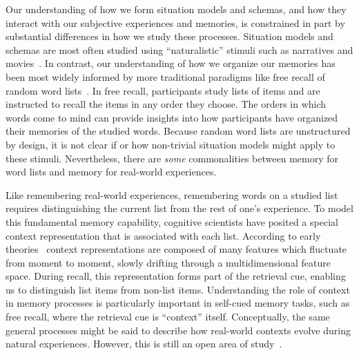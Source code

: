 \documentclass[11pt]{article}
\begin{document}

Our understanding of how we form situation models and schemas, and how they
interact with our subjective experiences and memories, is constrained in part
by substantial differences in how we study these processes. Situation models
and schemas are most often studied using ``naturalistic'' stimuli such as
narratives and movies~\citep{ZwaaEtal95,ZwaaRadv98, NastEtal20}. In contrast,
our understanding of how we organize our memories has been most widely informed
by more traditional paradigms like free recall of random word
lists~\citep{Kaha12, Kaha20}. In free recall, participants study lists of items
and are instructed to recall the items in any order they choose. The orders in
which words come to mind can provide insights into how participants have
organized their memories of the studied words. Because random word lists are
unstructured by design, it is not clear if or how non-trivial situation models
might apply to these stimuli. Nevertheless, there are \textit{some}
commonalities between memory for word lists and memory for real-world
experiences.

Like remembering real-world experiences, remembering words on a studied list
requires distinguishing the current list from the rest of one's experience. To
model this fundamental memory capability, cognitive scientists have posited a
special context representation that is associated with each list. According to
early theories~\citep[e.g.][]{Este55a,AndeBowe72} context representations are
composed of many features which fluctuate from moment to moment, slowly
drifting through a multidimensional feature space. During recall, this
representation forms part of the retrieval cue, enabling us to distinguish list
items from non-list items. Understanding the role of context in memory
processes is particularly important in self-cued memory tasks, such as free
recall, where the retrieval cue is ``context'' itself. Conceptually, the same
general processes might be said to describe how real-world contexts evolve
during natural experiences. However, this is still an open area of
study~\citep{Mann20, Mann21a}.
\end{document}
